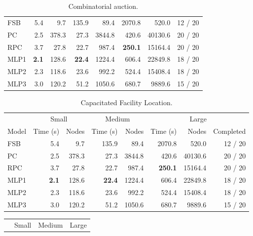 \begin{scriptsize}
\begin{table}[ht]
\begin{tabular}{lrrrrrrr}
		\midrule
		FSB & 5.4 &  9.7  & 135.9 &  89.4 & 2070.8 &  520.0 & 12 / 20\\
		PC &  2.5 & 378.3  &  27.3 &  3844.8 & 420.6 &  40130.6 & 20 / 20 \\
		RPC &  3.7 & 27.8  &  22.7 &  987.4 & \textbf{250.1} &  15164.4 & 20 / 20 \\
		\addlinespace
		MLP1 & \textbf{2.1} & 128.6 & \textbf{22.4} & 1224.4 & 606.4 & 22849.8 & 18 / 20\\
		MLP2 & 2.3          & 118.6 & 23.6          & 992.2 & 524.4 & 15408.4  & 18 / 20\\
		MLP3 & 3.0          & 120.2 & 51.2          & 1050.6 & 680.7 & 9889.6  & 15 / 20\\
		\bottomrule
	\end{tabular}
	\caption{Combinatorial auction.}\label{tab:results1_cauction}
\end{table}
\begin{table}[ht]
	\centering
	\begin{tabular}{lrrrrrrr}
		\toprule
		& \multicolumn{2}{c}{Small} & \multicolumn{2}{c}{Medium} & \multicolumn{3}{c}{Large}\\ \cmidrule(lr){2-3} \cmidrule(lr){4-5} \cmidrule(lr){6-8}
		Model & Time (s) & Nodes  & Time (s) & Nodes & Time (s) & Nodes & Completed\\
		\midrule
		FSB & 5.4 &  9.7  & 135.9 &  89.4 & 2070.8 &  520.0 & 12 / 20\\
		PC &  2.5 & 378.3  &  27.3 &  3844.8 & 420.6 &  40130.6 & 20 / 20 \\
		RPC &  3.7 & 27.8  &  22.7 &  987.4 & \textbf{250.1} &  15164.4 & 20 / 20 \\
		\addlinespace
		MLP1 & \textbf{2.1} & 128.6 & \textbf{22.4} & 1224.4 & 606.4 & 22849.8 & 18 / 20\\
		MLP2 & 2.3          & 118.6 & 23.6          & 992.2 & 524.4 & 15408.4  & 18 / 20\\
		MLP3 & 3.0          & 120.2 & 51.2          & 1050.6 & 680.7 & 9889.6  & 15 / 20\\
		\bottomrule
	\end{tabular}
	\caption{Capacitated Facility Location.}\label{tab:results1_facility}
\end{table}
\begin{table}[ht]
	\centering
	\begin{tabular}{lrrrrrrr}
		\toprule
		& \multicolumn{2}{c}{Small} & \multicolumn{2}{c}{Medium} & \multicolumn{3}{c}{Large}\\ \cmidrule(lr){2-3} \cmidrule(lr){4-5} \cmidrule(lr){6-8}

\end{tabular}
\end{table}
\end{scriptsize}
